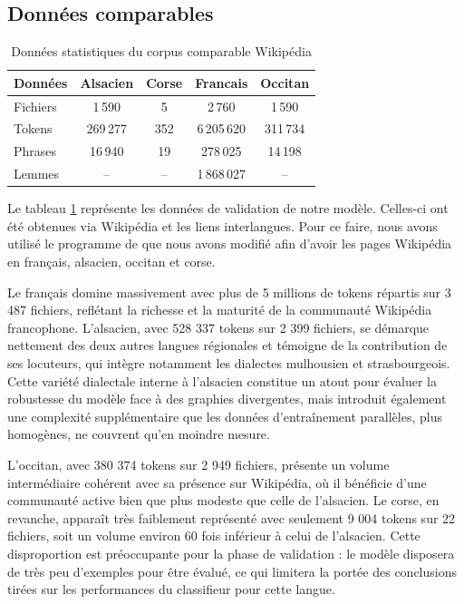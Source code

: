\subsection{Données comparables}

\begin{table}[h!]
\centering
\begin{tabular}{lcccc}
\hline
\textbf{Données} & \textbf{Alsacien} & \textbf{Corse} & \textbf{Francais} & \textbf{Occitan} \\
\hline
Fichiers & 1\,590 & 5 & 2\,760 & 1\,590 \\
Tokens & 269\,277 & 352 & 6\,205\,620 & 311\,734 \\
Phrases & 16\,940 & 19 & 278\,025 & 14\,198 \\
Lemmes & -- & -- & 1\,868\,027 & -- \\
\hline
\end{tabular}
\caption{Données statistiques du corpus comparable Wikipédia}
\label{table_donnees_comp}
\end{table}

Le tableau \ref{table_donnees_comp} représente les données de validation de notre modèle.
Celles-ci ont été obtenues via Wikipédia et les liens interlangues.
Pour ce faire, nous avons utilisé le programme de \citet{tsolakis_2024} que nous avons modifié afin d'avoir
les pages Wikipédia en français, alsacien, occitan et corse.

Le français domine massivement avec plus de 5 millions de tokens répartis sur {3 487} fichiers, reflétant la
richesse et la maturité de la communauté Wikipédia francophone. L'alsacien, avec {528 337} tokens sur {2 399}
fichiers, se démarque nettement des deux autres langues régionales et témoigne de la contribution
de ses locuteurs, qui intègre notamment les dialectes mulhousien et strasbourgeois.
Cette variété dialectale interne à l'alsacien constitue un atout pour évaluer la robustesse du modèle face
à des graphies divergentes, mais introduit également une complexité supplémentaire que les données
d'entraînement parallèles, plus homogènes, ne couvrent qu'en moindre mesure.

L'occitan, avec {380 374} tokens sur {2 949} fichiers, présente un volume intermédiaire cohérent avec sa présence
sur Wikipédia, où il bénéficie d'une communauté active bien que plus modeste que celle de l'alsacien.
Le corse, en revanche, apparaît très faiblement représenté avec seulement {9 004} tokens sur 22 fichiers,
soit un volume environ 60 fois inférieur à celui de l'alsacien. Cette disproportion est préoccupante pour
la phase de validation{ :} le modèle disposera de très peu d'exemples pour être évalué, ce qui limitera la
portée des conclusions tirées sur les performances du classifieur pour cette langue.

